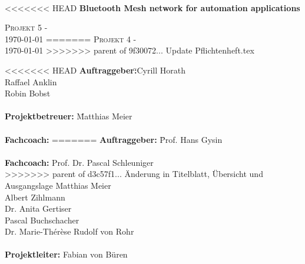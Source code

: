 \documentclass[final]{fhnwreport}       %
\begin{document}
	\begin{center}
		\vspace*{2cm}
		{\huge{\textbf{\thetitle}}}\\
		\vspace*{0.5cm}
		
<<<<<<< HEAD
		{\huge{\textbf{Bluetooth Mesh network for automation applications}}}\\
		\vspace*{0.5cm}
		
		{\scshape\Large Projekt 5 - \theauthor \\} \Large{\today}
=======
		{\scshape\Large Projekt 4 - \theauthor \\} \Large{\today}
>>>>>>> parent of 9f30072... Update Pflichtenheft.tex
		\vfill
		\begin{normalsize}
			{\begin{tabbing}
<<<<<<< HEAD
					\textbf{Auftraggeber:}\hspace{5cm}\= 
					\>Cyrill Horath \\ 
					\>Raffael Anklin \\ 
					\>Robin Bobst \\ 
					
					
					\\[0.8cm]
					\textbf{Projektbetreuer:} 
					\hspace{5cm}\= Matthias Meier\\
					
					\\[0.8cm]
					\textbf{Fachcoach:} 
=======
					\textbf{Auftraggeber:} \hspace{5cm}\= Prof. Hans Gysin\\
					
					\\[0.8cm]
					\textbf{Fachcoach:} 
					\>Prof. Dr. Pascal Schleuniger\\
>>>>>>> parent of d3c57f1... Änderung in Titelblatt, Übersicht und Ausgangslage
					\>Matthias Meier\\
					\>Albert Zihlmann\\
					\>Dr. Anita Gertiser\\
					\>Pascal Buchschacher\\
					\>Dr. Marie-Thérèse Rudolf von Rohr\\
					
					\\[0.4cm]
					\textbf{Projektleiter:} \>Fabian von Büren\\
					\\[0.4cm]


\end{tabbing}}
\end{normalsize}
\end{center}
\end{document}
